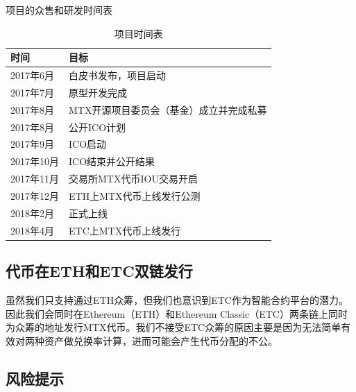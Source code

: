 \documentclass[UTF8,nofonts]{ctexart}
\begin{document}
项目的众售和研发时间表
\begin{table}[hbt]
  \centering
  \begin{tabular}{l|l}
 时间   & 目标\\
    \hline
  2017年6月 & 白皮书发布，项目启动 \\
  2017年7月 & 原型开发完成 \\
  2017年8月 & MTX开源项目委员会（基金）成立并完成私募 \\
  2017年8月 & 公开ICO计划 \\
  2017年9月 & ICO启动 \\
  2017年10月 & ICO结束并公开结果 \\
  2017年11月 & 交易所MTX代币IOU交易开启 \\
  2017年12月 & ETH上MTX代币上线发行公测 \\
  2018年2月 & 正式上线 \\
  2018年4月 & ETC上MTX代币上线发行 \\
  \end{tabular}
  \caption{项目时间表}
\end{table}

\subsection{代币在ETH和ETC双链发行\label{sec:chains}}

虽然我们只支持通过ETH众筹，但我们也意识到ETC作为智能合约平台的潜力。因此我们会同时在Ethereum（ETH）和Ethereum Classic（ETC）两条链上同时为众筹的地址发行MTX代币。我们不接受ETC众筹的原因主要是因为无法简单有效对两种资产做兑换率计算，进而可能会产生代币分配的不公。


\subsection{风险提示\label{sec:risks}}
\end{document}
